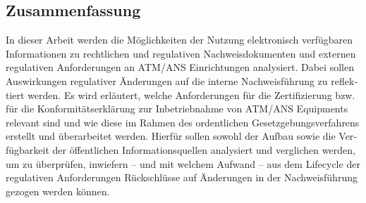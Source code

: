 \begin{otherlanguage}{ngerman}
    \chapter*{Zusammenfassung}


    In dieser Arbeit werden die Möglichkeiten der Nutzung elektronisch verfügbaren Informationen zu rechtlichen und regulativen Nachweisdokumenten und externen regulativen Anforderungen an ATM/ANS Einrichtungen analysiert. Dabei sollen Auswirkungen regulativer Änderungen auf die interne Nachweisführung zu reflektiert werden. 
    Es wird erläutert, welche Anforderungen für die Zertifizierung bzw. für die Konformitätserklärung  zur Inbetriebnahme von ATM/ANS Equipments relevant sind und wie diese im Rahmen des ordentlichen Gesetzgebungsverfahrens erstellt und überarbeitet werden. 
    Hierfür sollen sowohl der Aufbau sowie die Verfügbarkeit der öffentlichen Informationsquellen analysiert und verglichen werden, um zu überprüfen, inwiefern -- und mit welchem Aufwand -- aus dem Lifecycle der regulativen Anforderungen Rückschlüsse auf Änderungen in der Nachweisführung gezogen werden können.
 
\end{otherlanguage}
